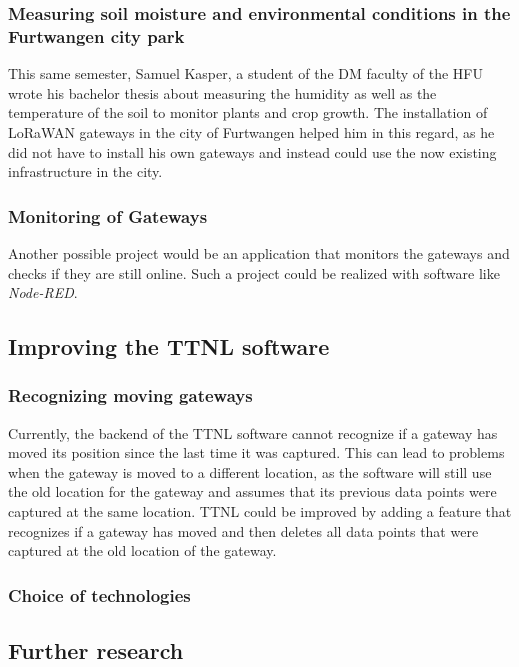 \subsubsection{Measuring soil moisture and environmental conditions in the Furtwangen city park}

This same semester, Samuel Kasper, a student of the \ac{DM} faculty of the \ac{HFU} wrote his bachelor thesis about measuring the humidity as well as the temperature of the soil to monitor plants and crop growth.
The installation of \ac{LoRaWAN} gateways in the city of Furtwangen helped him in this regard, as he did not have to install his own gateways and instead could use the now existing infrastructure in the city.

\subsubsection{Monitoring of Gateways}

Another possible project would be an application that monitors the gateways and checks if they are still online.
Such a project could be realized with software like \emph{Node-RED}.

\subsection{Improving the \acf{TTNL} software}

\subsubsection{Recognizing moving gateways}

Currently, the backend of the \ac{TTNL} software cannot recognize if a gateway has moved its position since the last time it was captured.
This can lead to problems when the gateway is moved to a different location, as the software will still use the old location for the gateway and assumes that its previous data
points were captured at the same location.
\ac{TTNL} could be improved by adding a feature that recognizes if a gateway has moved and then deletes all data points that were captured at the old location of the gateway.

\subsubsection{Choice of technologies}

\subsection{Further research}

